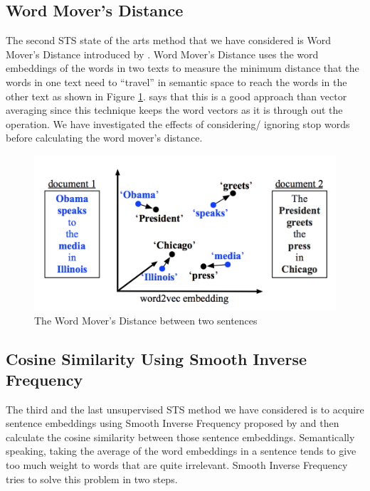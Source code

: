 \subsection{Word Mover's Distance}
The second STS state of the arts method that we have considered is Word Mover's Distance introduced by \citet{10.5555/3045118.3045221}. Word Mover's Distance uses the word embeddings of the words in two texts to measure the minimum distance that the words in one text need to ``travel'' in semantic space to reach the words in the other text as shown in Figure \ref{fig:WMD}. \citet{10.5555/3045118.3045221} says that this is a good approach than vector averaging since this technique keeps the word vectors as it is through out the operation. We have investigated the effects of considering/ ignoring stop words before calculating the word mover's distance.

\begin{figure}[ht]
	\centering
	\includegraphics[scale=0.4]{figures/semantic_textual_similarity/state_of_the_art/word_movers_distance.png}
	\caption{The Word Mover's Distance between two sentences}
	\label{fig:WMD}
\end{figure}

\subsection{Cosine Similarity Using Smooth Inverse Frequency}
The third and the last unsupervised STS method we have considered is to acquire sentence embeddings using Smooth Inverse Frequency proposed by \citet{DBLP:conf/iclr/AroraLM17} and then calculate the cosine similarity between those sentence embeddings. Semantically speaking, taking the average of the word embeddings in a sentence tends to give too much weight to words that are quite irrelevant. Smooth Inverse Frequency tries to solve this problem in two steps. 

